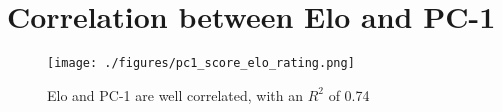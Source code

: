 \section{Correlation between Elo and PC-1}


\begin{figure*}[h]
    \centering
    \texttt{[image: ./figures/pc1\_score\_elo\_rating.png]}
    \vskip -0.1in
    \caption{Elo and PC-1 are well correlated, with an $R^2$ of 0.74} 
    \label{fig:elo-pc1-correlation}
\end{figure*}


